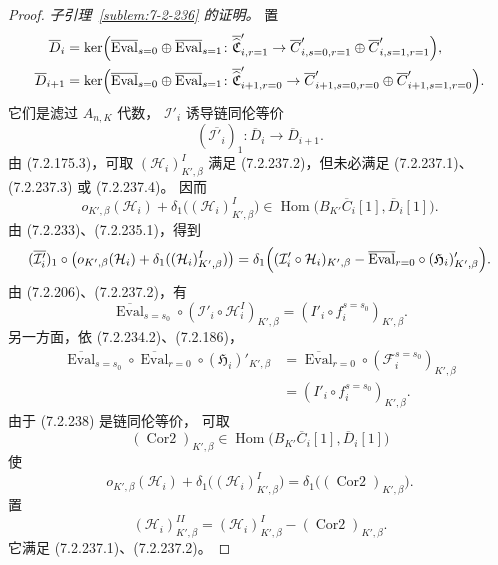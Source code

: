 \begin{proof}
\par\noindent\textit{子引理~\ref{sublem:7-2-236} 的证明。}
置
\[
\begin{aligned}
\overline D_i
&=\ker\Bigl(
\overline{\operatorname{Eval}}_{s=0}\oplus
\overline{\operatorname{Eval}}_{s=1}\colon
\overline{\widehat{\mathfrak C}}'_{i,r=1}
\to\overline C'_{i,s=0,r=1}\oplus
\overline C'_{i,s=1,r=1}
\Bigr),\\
\overline D_{i+1}
&=\ker\Bigl(
\overline{\operatorname{Eval}}_{s=0}\oplus
\overline{\operatorname{Eval}}_{s=1}\colon
\overline{\widehat{\mathfrak C}}'_{i+1,r=0}
\to\overline C'_{i+1,s=0,r=0}\oplus
\overline C'_{i+1,s=1,r=0}
\Bigr).
\end{aligned}
\]
它们是滤过 $A_{n,K}$ 代数，
$\mathcal I'_i$ 诱导链同伦等价
\begin{equation}
(\overline{\mathcal I'_i})_1\colon
\overline D_i\longrightarrow\overline D_{i+1}.
\tag{7.2.238}\label{eq:7-2-238}
\end{equation}
由 (7.2.175.3)，可取
$(\mathcal H_i)^I_{K',\beta}$
满足 (7.2.237.2)，但未必满足
(7.2.237.1)、(7.2.237.3) 或 (7.2.237.4)。
因而
\begin{equation}
o_{K',\beta}(\mathcal H_i)
+\delta_1\bigl((\mathcal H_i)^I_{K',\beta}\bigr)
\in\operatorname{Hom}\bigl(
B_{K'}\overline C_i[1],\overline D_i[1]
\bigr).
\tag{7.2.239}\label{eq:7-2-239}
\end{equation}
由 (7.2.233)、(7.2.235.1)，得到
\[
\begin{aligned}
(\overline{\mathcal I'_i})_1\circ
\bigl(o_{K',\beta}(\mathcal H_i)
+\delta_1((\mathcal H_i)^I_{K',\beta})\bigr)
=\delta_1\Bigl(
(\mathcal I'_i\circ\mathcal H_i)_{K',\beta}
-\overline{\operatorname{Eval}}_{r=0}\circ
(\mathfrak H_i)'_{K',\beta}
\Bigr).
\end{aligned}
\]
由 (7.2.206)、(7.2.237.2)，有
\[
\overline{\operatorname{Eval}}_{s=s_0}\circ
(\mathcal I'_i\circ\mathcal H_i^I)_{K',\beta}
=(I'_i\circ f_i^{s=s_0})_{K',\beta}.
\]
另一方面，依 (7.2.234.2)、(7.2.186)，
\[
\begin{aligned}
\overline{\operatorname{Eval}}_{s=s_0}\circ
\overline{\operatorname{Eval}}_{r=0}\circ
(\mathfrak H_i)'_{K',\beta}
&=\overline{\operatorname{Eval}}_{r=0}\circ
(\mathcal F_i^{s=s_0})_{K',\beta}\\
&=(I'_i\circ f_i^{s=s_0})_{K',\beta}.
\end{aligned}
\]
由于 (7.2.238) 是链同伦等价，
可取
\[
(\operatorname{Cor2})_{K',\beta}
\in\operatorname{Hom}\bigl(
B_{K'}\overline C_i[1],\overline D_i[1]
\bigr)
\]
使
\[
o_{K',\beta}(\mathcal H_i)
+\delta_1\bigl((\mathcal H_i)^I_{K',\beta}\bigr)
=\delta_1\bigl((\operatorname{Cor2})_{K',\beta}\bigr).
\]
置
\[
(\mathcal H_i)^{II}_{K',\beta}
=(\mathcal H_i)^I_{K',\beta}
-(\operatorname{Cor2})_{K',\beta}.
\]
它满足 (7.2.237.1)、(7.2.237.2)。


\end{proof}
